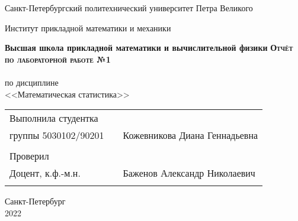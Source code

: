 \documentclass[a4paper]{article}
\begin{document}
\begin{titlepage}
  \begin{center}
    \large
    Санкт-Петербургский политехнический университет Петра Великого
    
    Институт прикладной математики и механики
    
    \textbf{Высшая школа прикладной математики и вычислительной физики}
    \vfill
    \textsc{\textbf{\Large{Отчёт по лабораторной работе №1}}}\\[5mm]
    \\ по дисциплине\\ <<Математическая статистика>>\\
\end{center}

\vfill

\begin{tabular}{l p{} l}
Выполнила студентка \\группы 5030102/90201 && Кожевникова Диана Геннадьевна \\
\\
Проверил\\Доцент, к.ф.-м.н.& \hspace{0pt} &   Баженов Александр Николаевич \\\\
\end{tabular}

\hfill \break
\hfill \break
\begin{center} Санкт-Петербург \\2022 \end{center}
\thispagestyle{empty}
\end{titlepage}
\newpage
\newpage
\begin{center}
    \setcounter{page}{2}
    \tableofcontents
\end{center}
\newpage
\begin{center}
    \setcounter{page}{3}
    \listoffigures
\end{center}
\newpage
\end{document}
